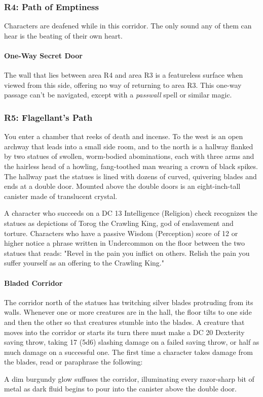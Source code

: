\documentclass[10pt,a4,twoside,twocolumn,openany,nodeprecatedcode]{dndbook}
\begin{document}
\subsubsection{R4: Path of Emptiness}
Characters are deafened while in this corridor. The only sound any of them can hear is the beating of their own heart.
\paragraph{One-Way Secret Door}
The wall that lies between area R4 and area R3 is a featureless surface when viewed from this side, offering no way of returning to area R3. This one-way passage can't be navigated, except with a \textit{passwall} spell or similar magic.
\subsubsection{R5: Flagellant's Path}
\begin{DndReadAloud}{}
You enter a chamber that reeks of death and incense. To the west is an open archway that leads into a small side room, and to the north is a hallway flanked by two statues of swollen, worm-bodied abominations, each with three arms and the hairless head of a howling, fang-toothed man wearing a crown of black spikes.
The hallway past the statues is lined with dozens of curved, quivering blades and ends at a double door. Mounted above the double doors is an eight-inch-tall canister made of translucent crystal.
\end{DndReadAloud}

A character who succeeds on a DC 13 Intelligence (Religion) check recognizes the statues as depictions of Torog the Crawling King, god of enslavement and torture. Characters who have a passive Wisdom (Perception) score of 12 or higher notice a phrase written in Undercommon on the floor between the two statues that reads: "Revel in the pain you inflict on others. Relish the pain you suffer yourself as an offering to the Crawling King."
\paragraph{Bladed Corridor}
The corridor north of the statues has twitching silver blades protruding from its walls. Whenever one or more creatures are in the hall, the floor tilts to one side and then the other so that creatures stumble into the blades. A creature that moves into the corridor or starts its turn there must make a DC 20 Dexterity saving throw, taking 17 (5d6) slashing damage on a failed saving throw, or half as much damage on a successful one.
The first time a character takes damage from the blades, read or paraphrase the following:
\begin{DndReadAloud}{}
A dim burgundy glow suffuses the corridor, illuminating every razor-sharp bit of metal as dark fluid begins to pour into the canister above the double door.
\end{DndReadAloud}
\end{document}
